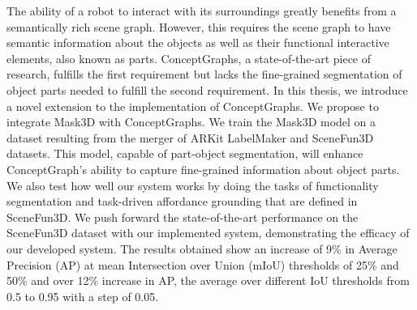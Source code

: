 The ability of a robot to interact with its surroundings greatly benefits from a semantically rich scene graph. However, this requires the scene graph to have semantic information about the objects as well as their functional interactive elements, also known as parts. ConceptGraphs, a state-of-the-art piece of research, fulfills the first requirement but lacks the fine-grained segmentation of object parts needed to fulfill the second requirement. In this thesis, we introduce a novel extension to the implementation of ConceptGraphs. We propose to integrate Mask3D with ConceptGraphs. We train the Mask3D model on a dataset resulting from the merger of ARKit LabelMaker and SceneFun3D datasets. This model, capable of part-object segmentation, will enhance ConceptGraph's ability to capture fine-grained information about object parts. We also test how well our system works by doing the tasks of functionality segmentation and task-driven affordance grounding that are defined in SceneFun3D. We push forward the state-of-the-art performance on the SceneFun3D dataset with our implemented system, demonstrating the efficacy of our developed system. The results obtained show an increase of 9\% in Average Precision (AP) at mean Intersection over Union (mIoU) thresholds of 25\% and 50\% and over 12\% increase in AP,  the average over
different IoU thresholds from 0.5 to 0.95 with a step of 0.05.